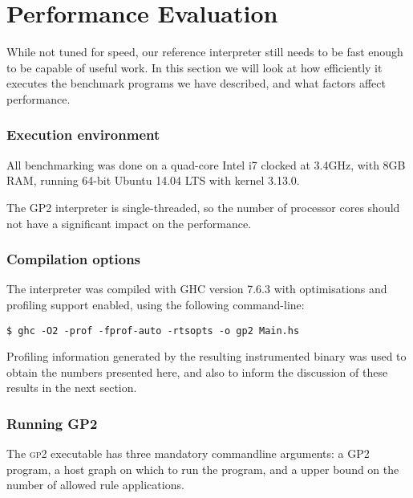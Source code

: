 \section{Performance Evaluation}\label{sec:performanceevaluation}

While not tuned for speed, our reference interpreter still needs to be fast enough to be capable of useful work. In this section we will look at how efficiently it executes the benchmark programs we have described, and what factors affect performance.



\subsubsection*{Execution environment}

All benchmarking was done on a quad-core Intel i7 clocked at 3.4GHz, with 8GB RAM, running 64-bit Ubuntu 14.04 LTS with kernel 3.13.0.

The GP2 interpreter is single-threaded, so the number of processor cores should not have a significant impact on the performance.


\subsubsection*{Compilation options}

The interpreter was compiled with GHC version 7.6.3 with optimisations and profiling support enabled, using the following command-line:

\begin{verbatim}
$ ghc -O2 -prof -fprof-auto -rtsopts -o gp2 Main.hs
\end{verbatim}

Profiling information generated by the resulting instrumented binary was used to obtain the numbers presented here, and also to inform the discussion of these results in the next section.


\subsubsection*{Running GP2}

The \textsc{gp2} executable has three mandatory commandline arguments: a GP2 program, a host graph on which to run the program, and a upper bound on the number of allowed rule applications.

